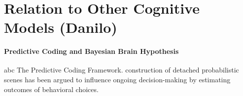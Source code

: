 \documentclass{article} %
\DeclareMathOperator{\argmax}{argmax}
\begin{document}





\section{Relation to Other Cognitive Models (Danilo)}
\paragraph{Predictive Coding and Bayesian Brain Hypothesis}
abc
The Predictive Coding Framework.
construction of detached probabilistic scenes has been argued to influence ongoing decision-making by estimating outcomes of behavioral choices.
\end{document}
